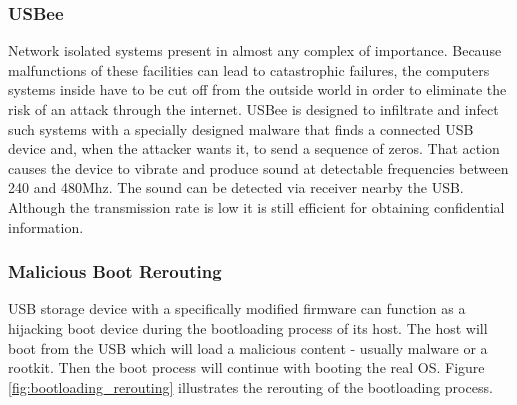 \documentclass[sigconf]{acmart}
\begin{document}
\subsubsection{USBee}
\par \quad Network isolated systems \cite{usbee} present in almost any complex of importance. Because malfunctions of these facilities can lead to catastrophic failures, the computers systems inside have to be cut off from the outside world in order to eliminate the risk of an attack through the internet. USBee is designed to infiltrate and infect such systems with a specially designed malware that finds a connected USB device and, when the attacker wants it, to send a sequence of zeros. That action causes the device to vibrate and produce sound at detectable frequencies between 240 and 480Mhz. The sound can be detected via receiver nearby the USB. Although the transmission rate is low it is still efficient for obtaining confidential information.

\subsubsection{Malicious Boot Rerouting}
\par \quad USB storage device with a specifically modified firmware can function as a hijacking boot device during the bootloading process of its host. The host will boot from the USB which will load a malicious content - usually malware or a rootkit. Then the boot process will continue with booting the real OS. Figure \ref{fig:bootloading_rerouting} illustrates the rerouting of the bootloading process. 
\end{document}
